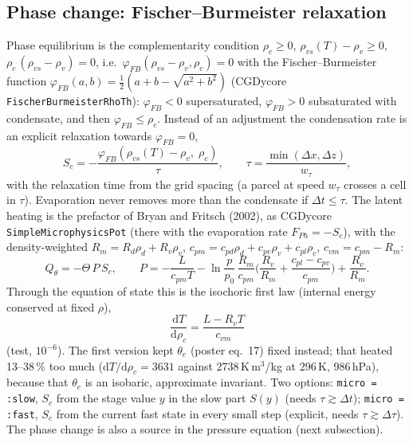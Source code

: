 \documentclass[11pt,a4paper]{article}
\newcommand{\code}[1]{\texttt{#1}}
\begin{document}
\subsection{Phase change: Fischer--Burmeister relaxation}
Phase equilibrium is the complementarity condition $\rho_c\ge0$, $\rho_{vs}(T)-\rho_v\ge0$,
$\rho_c\,(\rho_{vs}-\rho_v)=0$, i.e.\ $\varphi_{FB}(\rho_{vs}-\rho_v,\rho_c)=0$ with the
Fischer--Burmeister function $\varphi_{FB}(a,b)=\tfrac12(a+b-\sqrt{a^2+b^2})$ (CGDycore
\code{FischerBurmeisterRhoTh}): $\varphi_{FB}<0$ supersaturated, $\varphi_{FB}>0$ subsaturated with
condensate, and then $\varphi_{FB}\le\rho_c$. Instead of an adjustment the condensation rate is an explicit
relaxation towards $\varphi_{FB}=0$,
\[
S_c=-\frac{\varphi_{FB}(\rho_{vs}(T)-\rho_v,\;\rho_c)}{\tau},\qquad \tau=\frac{\min(\Delta x,\Delta z)}{w_\tau},
\]
with the relaxation time from the grid spacing (a parcel at speed $w_\tau$ crosses a cell in $\tau$).
Evaporation never removes more than the condensate if $\Delta t\le\tau$. The latent heating is the
prefactor of Bryan and Fritsch (2002), as CGDycore \code{SimpleMicrophysicsPot} (there with the
evaporation rate $F_{Ph}=-S_c$), with the density-weighted $R_m=R_d\rho_d+R_v\rho_v$,
$c_{pm}=c_{pd}\rho_d+c_{pv}\rho_v+c_{pl}\rho_c$, $c_{vm}=c_{pm}-R_m$:
\[
Q_\theta=-\Theta\,P\,S_c,\qquad
P=-\frac{L}{c_{pm}T}-\ln\frac{p}{p_0}\,\frac{R_m}{c_{pm}}\Big(\frac{R_v}{R_m}+\frac{c_{pl}-c_{pv}}{c_{pm}}\Big)+\frac{R_v}{R_m}.
\]
Through the equation of state this is the isochoric first law (internal energy conserved at fixed $\rho$),
\[
\frac{\mathrm dT}{\mathrm d\rho_c}=\frac{L-R_vT}{c_{vm}}
\]
(test, $10^{-6}$). The first version kept $\theta_e$ (poster eq.~17) fixed instead; that heated 13--38\,\%
too much ($\mathrm dT/\mathrm d\rho_c=3631$ against 2738\,K\,m$^3$/kg at 296\,K, 986\,hPa), because that
$\theta_e$ is an isobaric, approximate invariant. Two options:
\code{micro = :slow}, $S_c$ from the stage value $y$ in the slow part $S(y)$ (needs $\tau\gtrsim\Delta t$);
\code{micro = :fast}, $S_c$ from the current fast state in every small step (explicit, needs
$\tau\gtrsim\Delta\tau$). The phase change is also a source in the pressure equation (next
subsection).
\end{document}
